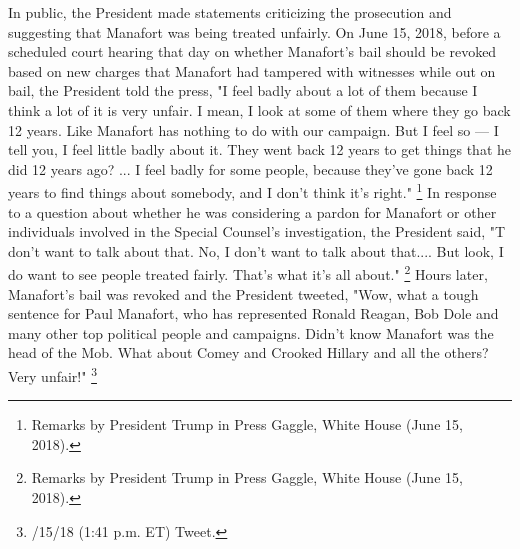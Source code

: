 {In public, the President made statements criticizing the prosecution and suggesting that Manafort was being treated unfairly.
On June 15, 2018, before a scheduled court hearing that day on whether Manafort's bail should be revoked based on new charges that Manafort had tampered with witnesses while out on bail, the President told the press, "I feel badly about a lot of them because I think a lot of it is very unfair.
I mean, I look at some of them where they go back 12 years.
Like Manafort has nothing to do with our campaign.
But I feel so — I tell you, I feel little badly about it.
They went back 12 years to get things that he did 12 years ago? ...
I feel badly for some people, because they've gone back 12 years to find things about somebody, and I don't think it's right."%
\footnote{Remarks by President Trump in Press Gaggle, White House (June 15, 2018).}
In response to a question about whether he was considering a pardon for Manafort or other individuals involved in the Special Counsel's investigation, the President said, "T don't want to talk about that.
No, I don't want to talk about that....
But look, I do want to see people treated fairly.
That's what it's all about."%
\footnote{Remarks by President Trump in Press Gaggle, White House (June 15, 2018).}
Hours later, Manafort's bail was revoked and the President tweeted, "Wow, what a tough sentence for Paul Manafort, who has represented Ronald Reagan, Bob Dole and many other top political people and campaigns.
Didn't know Manafort was the head of the Mob.
What about Comey and Crooked Hillary and all the others?
Very unfair!"%
\footnote{/15/18 (1:41 p.m. ET) Tweet.}

}
